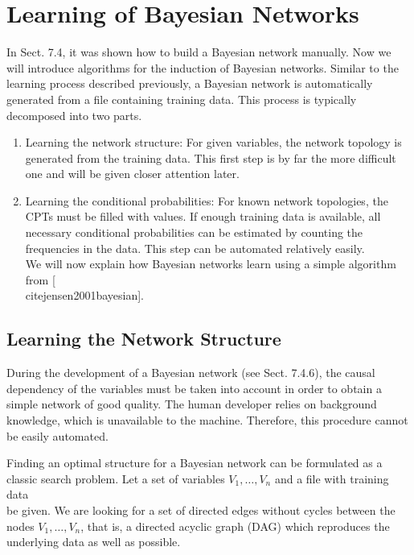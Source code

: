 \documentclass[10pt]{book}
\begin{document}
\section{Learning of Bayesian Networks}
In Sect. 7.4, it was shown how to build a Bayesian network manually. Now we will introduce algorithms for the induction of Bayesian networks. Similar to the learning process described previously, a Bayesian network is automatically generated from a file containing training data. This process is typically decomposed into two parts.


\begin{enumerate}
  \item Learning the network structure: For given variables, the network topology is generated from the training data. This first step is by far the more difficult one and will be given closer attention later.
  \item Learning the conditional probabilities: For known network topologies, the CPTs must be filled with values. If enough training data is available, all necessary conditional probabilities can be estimated by counting the frequencies in the data. This step can be automated relatively easily.\\[0pt]
We will now explain how Bayesian networks learn using a simple algorithm from [\\cite{jensen2001bayesian}].
\end{enumerate}

\subsection{Learning the Network Structure}
During the development of a Bayesian network (see Sect. 7.4.6), the causal dependency of the variables must be taken into account in order to obtain a simple network of good quality. The human developer relies on background knowledge, which is unavailable to the machine. Therefore, this procedure cannot be easily automated.

Finding an optimal structure for a Bayesian network can be formulated as a classic search problem. Let a set of variables $V_{1}, \ldots, V_{n}$ and a file with training data\\
be given. We are looking for a set of directed edges without cycles between the nodes $V_{1}, \ldots, V_{n}$, that is, a directed acyclic graph (DAG) which reproduces the underlying data as well as possible.
\end{document}
